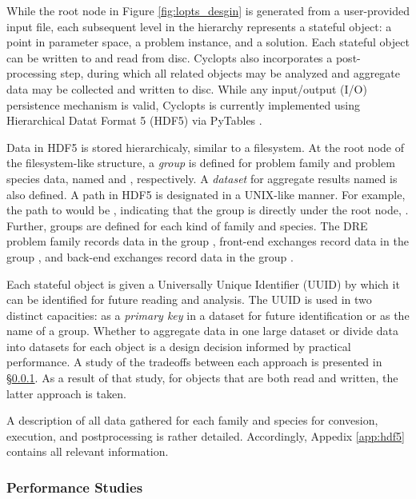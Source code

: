 While the root node in Figure \ref{fig:lopts_desgin} is generated from a
user-provided input file, each subsequent level in the hierarchy represents a
stateful object: a point in parameter space, a problem instance, and a
solution. Each stateful object can be written to and read from disc. Cyclopts
also incorporates a post-processing step, during which all related objects may
be analyzed and aggregate data may be collected and written to disc. While any
input/output (I/O) persistence mechanism is valid, Cyclopts is currently
implemented using Hierarchical Datat Format 5 (HDF5) \cite{hdf5} via PyTables
\cite{pytables}.

Data in HDF5 is stored hierarchicaly, similar to a filesystem. At the root node
of the filesystem-like structure, a \textit{group} is defined for problem family
and problem species data, named  and ,
respectively. A \textit{dataset} for aggregate results named  is
also defined. A path in HDF5 is designated in a UNIX-like manner. For example,
the path to  would be , indicating that the group is
directly under the root node, \code{/}. Further, groups are defined for each
kind of family and species. The DRE problem family records data in the group
, front-end exchanges record data in the group
, and back-end exchanges record data in the
group . 

Each stateful object is given a Universally Unique Identifier (UUID) by which it
can be identified for future reading and analysis. The UUID is used in two
distinct capacities: as a \textit{primary key} in a dataset for future
identification or as the name of a group. Whether to aggregate data in one large
dataset or divide data into datasets for each object is a design decision
informed by practical performance. A study of the tradeoffs between each
approach is presented in \S \ref{method:tools:hdf5:study}. As a result of that
study, for objects that are both read and written, the latter approach is taken.

A description of all data gathered for each family and species for convesion,
execution, and postprocessing is rather detailed. Accordingly, Appedix
\ref{app:hdf5} contains all relevant information.

\subsubsection{Performance Studies}\label{method:tools:hdf5:study}

